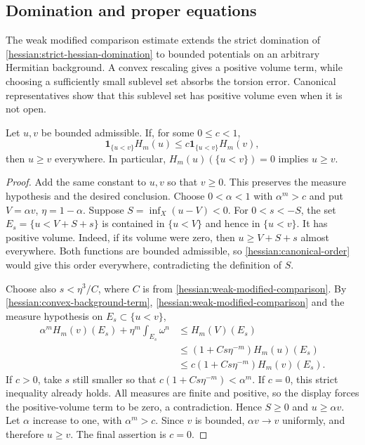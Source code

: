 \subsection{Domination and proper equations}
\label{subsec:hessian-bounded-domination}

The weak modified comparison estimate extends the strict domination
of \cref{hessian:strict-hessian-domination} to bounded potentials
on an arbitrary Hermitian background. A convex rescaling gives a
positive volume term, while choosing a sufficiently small sublevel
set absorbs the torsion error. Canonical representatives show that
this sublevel set has positive volume even when it is not open.

\begin{theorem}\label{hessian:strict-bounded-domination}
Let $u,v$ be bounded admissible. If, for some $0\leq c<1$,
\[
 \mathbf1_{\{u<v\}}H_m(u)
                  \leq c\mathbf1_{\{u<v\}}H_m(v),
\]
then $u\geq v$ everywhere. In particular, $H_m(u)(\{u<v\})=0$ implies $u\geq v$.
\end{theorem}
\begin{proof}
Add the same constant to $u,v$ so that $v\geq0$.
This preserves the measure hypothesis and the desired conclusion.
Choose $0<\alpha<1$ with $\alpha^m>c$ and put $V=\alpha v$,
$\eta=1-\alpha$. Suppose $S=\inf_X(u-V)<0$.
For $0<s<-S$, the set $E_s=\{u<V+S+s\}$ is contained in
$\{u<V\}$ and hence in $\{u<v\}$.
It has positive volume. Indeed, if its volume were zero, then
$u\geq V+S+s$ almost everywhere. Both functions are bounded
admissible, so
\cref{hessian:canonical-order} would give this order everywhere,
contradicting the definition of $S$.

Choose also $s<\eta^3/C$, where $C$ is from \cref{hessian:weak-modified-comparison}.
By \cref{hessian:convex-background-term}, \cref{hessian:weak-modified-comparison}
and the measure hypothesis on $E_s\subset\{u<v\}$,
\[
\begin{aligned}
 \alpha^m H_m(v)(E_s)+\eta^m\int_{E_s}\omega^n
 &\leq H_m(V)(E_s)\\
 &\leq(1+Cs\eta^{-m})H_m(u)(E_s)\\
 &\leq c(1+Cs\eta^{-m})H_m(v)(E_s).
\end{aligned}
\]
If $c>0$, take $s$ still smaller so that
$c(1+Cs\eta^{-m})<\alpha^m$. If $c=0$, this strict inequality
already holds. All measures are finite and positive, so the
display forces the positive-volume term to be zero, a contradiction.
Hence $S\geq0$ and $u\geq\alpha v$. Let $\alpha$ increase
to one, with $\alpha^m>c$. Since $v$ is bounded, $\alpha v\to v$
uniformly, and therefore $u\geq v$. The final assertion is $c=0$.
\end{proof}

